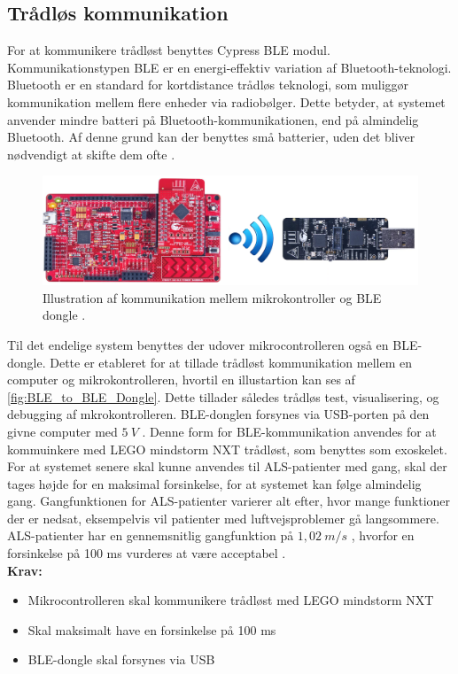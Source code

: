 \subsection{Trådløs kommunikation}
For at kommunikere trådløst benyttes Cypress BLE modul. Kommunikationstypen BLE \citep{cypressguide2014} er en energi-effektiv variation af Bluetooth-teknologi. Bluetooth er en standard for kortdistance trådløs teknologi, som muliggør kommunikation mellem flere enheder via radiobølger. Dette betyder, at systemet anvender mindre batteri på Bluetooth-kommunikationen, end på almindelig Bluetooth. Af denne grund kan der benyttes små batterier, uden det bliver nødvendigt at skifte dem ofte \citep{gupta2013}. 


\begin{figure}[H]
	\centering
	\includegraphics[width=1\textwidth]{figures/BLEToBLEdongle}
	\caption{Illustration af kommunikation mellem mikrokontroller og BLE dongle \citep{cypresspsoc2015, cypressguide2014}.}
	\label{fig:BLE_to_BLE_Dongle}
\end{figure}

\noindent
Til det endelige system benyttes der udover mikrocontrolleren også en BLE-dongle. Dette er etableret for at tillade trådløst kommunikation mellem en computer og mikrokontrolleren, hvortil en illustartion kan ses af \autoref{fig:BLE_to_BLE_Dongle}. Dette tillader således trådløs test, visualisering, og debugging af mkrokontrolleren. BLE-donglen forsynes via USB-porten på den givne computer med $5~V$ \citep{cypressguide2014}. Denne form for BLE-kommunikation anvendes for at kommuinkere med LEGO mindstorm NXT trådløst, som benyttes som exoskelet. For at systemet senere skal kunne anvendes til ALS-patienter med gang, skal der tages højde for en maksimal forsinkelse, for at systemet kan følge almindelig gang. Gangfunktionen for ALS-patienter varierer alt efter, hvor mange funktioner der er nedsat, eksempelvis vil patienter med luftvejsproblemer gå langsommere. ALS-patienter har en gennemsnitlig gangfunktion på $1,02~m/s$ \citep{hausdorff2000}, hvorfor en forsinkelse på 100 ms vurderes at være acceptabel . 
\\

\textbf{Krav:}
\begin{itemize}
\item Mikrocontrolleren skal kommunikere trådløst med LEGO mindstorm NXT
\item Skal maksimalt have en forsinkelse på 100 ms 
\item BLE-dongle skal forsynes via USB
\end{itemize}